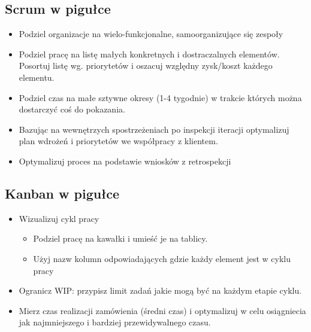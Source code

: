 \documentclass[epic,eepic,aspectratio=169,12pt]{article}
\begin{document}
\subsection{Scrum w pigułce}
\begin{itemize}
	\item Podziel organizacje na wielo-funkcjonalne, samoorganizujące się zespoły
	\item Podziel pracę na listę małych konkretnych i dostraczalnych elementów. Posortuj listę wg. priorytetów i oszacuj względny zysk/koszt każdego elementu.
	\item Podziel czas na małe sztywne okresy (1-4 tygodnie) w trakcie których można dostarczyć coś do pokazania.
	\item Bazując na wewnętrzych spostrzeżeniach po inspekcji iteracji optymalizuj plan wdrożeń i priorytetów we współpracy z klientem.
	\item Optymalizuj proces na podstawie wniosków z retrospekcji
	\end{itemize}
\subsection{Kanban w pigułce}
\begin{itemize}
	\item Wizualizuj cykl pracy
	\begin{itemize}
		\item Podziel pracę na kawałki i umieść je na tablicy.
		\item Użyj nazw kolumn odpowiadających gdzie każdy element jest w cyklu pracy
	\end{itemize}
	\item Ogranicz WIP: przypisz limit zadań jakie mogą być na każdym etapie cyklu.
	\item Mierz czas realizacji zamówienia (średni czas) i optymalizuj w celu osiągniecia jak najmniejszego i bardziej przewidywalnego czasu.
	
\end{itemize}
\end{document}
